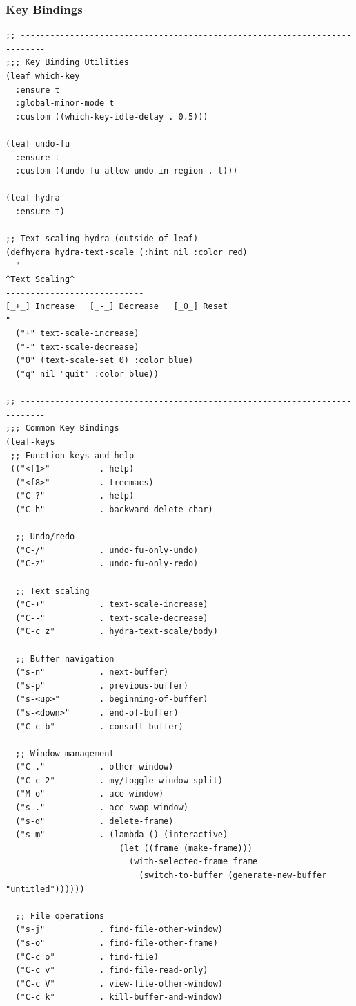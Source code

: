 \documentclass[11pt]{article}
\begin{document}
\subsubsection{Key Bindings}
\label{sec:org6cc2256}

\begin{verbatim}
;; ---------------------------------------------------------------------------
;;; Key Binding Utilities
(leaf which-key
  :ensure t
  :global-minor-mode t
  :custom ((which-key-idle-delay . 0.5)))

(leaf undo-fu
  :ensure t
  :custom ((undo-fu-allow-undo-in-region . t)))

(leaf hydra
  :ensure t)

;; Text scaling hydra (outside of leaf)
(defhydra hydra-text-scale (:hint nil :color red)
  "
^Text Scaling^
----------------------------
[_+_] Increase   [_-_] Decrease   [_0_] Reset
"
  ("+" text-scale-increase)
  ("-" text-scale-decrease)
  ("0" (text-scale-set 0) :color blue)
  ("q" nil "quit" :color blue))

;; ---------------------------------------------------------------------------
;;; Common Key Bindings
(leaf-keys
 ;; Function keys and help
 (("<f1>"          . help)
  ("<f8>"          . treemacs)
  ("C-?"           . help)
  ("C-h"           . backward-delete-char)

  ;; Undo/redo
  ("C-/"           . undo-fu-only-undo)
  ("C-z"           . undo-fu-only-redo)

  ;; Text scaling
  ("C-+"           . text-scale-increase)
  ("C--"           . text-scale-decrease)
  ("C-c z"         . hydra-text-scale/body)

  ;; Buffer navigation
  ("s-n"           . next-buffer)
  ("s-p"           . previous-buffer)
  ("s-<up>"        . beginning-of-buffer)
  ("s-<down>"      . end-of-buffer)
  ("C-c b"         . consult-buffer)

  ;; Window management
  ("C-."           . other-window)
  ("C-c 2"         . my/toggle-window-split)
  ("M-o"           . ace-window)
  ("s-."           . ace-swap-window)
  ("s-d"           . delete-frame)
  ("s-m"           . (lambda () (interactive)
                       (let ((frame (make-frame)))
                         (with-selected-frame frame
                           (switch-to-buffer (generate-new-buffer "untitled"))))))

  ;; File operations
  ("s-j"           . find-file-other-window)
  ("s-o"           . find-file-other-frame)
  ("C-c o"         . find-file)
  ("C-c v"         . find-file-read-only)
  ("C-c V"         . view-file-other-window)
  ("C-c k"         . kill-buffer-and-window)


\end{verbatim}
\end{document}
